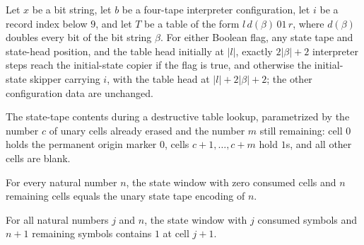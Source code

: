 \begin{lemma}
\label{Turing.universal_count_run}
\leanok
{}
Let $x$ be a bit string, let $b$ be a four-tape interpreter configuration, let $i$ be a
record index below $9$, and let $T$ be a table of the form $l\,d(\beta)\,01\,r$, where
$d(\beta)$ doubles every bit of the bit string $\beta$. For either Boolean flag, any
state tape and state-head position, and the table head initially at $|l|$, exactly
$2|\beta|+2$ interpreter steps reach the initial-state copier if the flag is true, and
otherwise the initial-state skipper carrying $i$, with the table head at
$|l|+2|\beta|+2$; the other configuration data are unchanged.
\end{lemma}

\begin{definition}
\label{Turing.universalStateWindow}
\leanok
The state-tape contents during a destructive table lookup, parametrized by
the number $c$ of unary cells already erased and the number $m$ still
remaining: cell $0$ holds the permanent origin marker $0$, cells
$c + 1, \dots, c + m$ hold $1$s, and all other cells are blank.
\end{definition}

\begin{lemma}
\label{Turing.universalStateWindow_zero}
\leanok
{}
For every natural number $n$, the state window with zero consumed cells and $n$
remaining cells equals the unary state tape encoding of $n$.
\end{lemma}

\begin{lemma}
\label{Turing.universalStateWindow_read}
\leanok
{}
For all natural numbers $j$ and $n$, the state window with $j$ consumed symbols and
$n+1$ remaining symbols contains $1$ at cell $j+1$.
\end{lemma}

